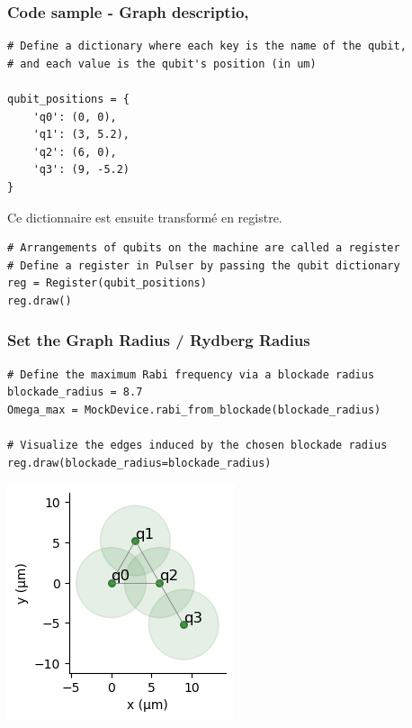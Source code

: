 \begin{frame}[fragile]
\frametitle{Code sample - Graph descriptio,}
\begin{verbatim}
# Define a dictionary where each key is the name of the qubit,
# and each value is the qubit's position (in um)

qubit_positions = {
    'q0': (0, 0),
    'q1': (3, 5.2),
    'q2': (6, 0),
    'q3': (9, -5.2)
}
\end{verbatim}

Ce dictionnaire est ensuite transformé en registre.
\\
\begin{verbatim}
# Arrangements of qubits on the machine are called a register
# Define a register in Pulser by passing the qubit dictionary
reg = Register(qubit_positions)
reg.draw()
\end{verbatim}
\end{frame}

\begin{frame}[fragile]
\frametitle{Set the Graph Radius / Rydberg Radius}
\begin{verbatim}
# Define the maximum Rabi frequency via a blockade radius
blockade_radius = 8.7
Omega_max = MockDevice.rabi_from_blockade(blockade_radius)

# Visualize the edges induced by the chosen blockade radius
reg.draw(blockade_radius=blockade_radius)
\end{verbatim}
\begin{center}
\includegraphics[scale=0.60]{images/reg3.png}
\end{center}

\end{frame}

